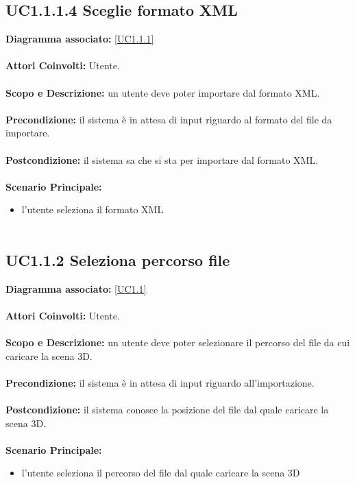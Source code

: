 \subsection{UC1.1.1.4 Sceglie formato XML}
\textbf{Diagramma associato:}
\ref{UC1.1.1} \\ \\
\textbf{Attori Coinvolti:}
Utente. \\ \\
\textbf{Scopo e Descrizione:}
un utente deve poter importare dal formato XML. \\ \\
\textbf{Precondizione:}
il sistema è in attesa di input riguardo al formato del file da importare. \\ \\
\textbf{Postcondizione:}
il sistema sa che si sta per importare dal formato XML. \\ \\
\textbf{Scenario Principale:}
\begin{itemize}
\item l'utente seleziona il formato XML
\\ \\ \end{itemize}


\subsection{UC1.1.2 Seleziona percorso file}
\textbf{Diagramma associato:}
\ref{UC1.1} \\ \\
\textbf{Attori Coinvolti:}
Utente. \\ \\
\textbf{Scopo e Descrizione:}
un utente deve poter selezionare il percorso del file da cui caricare la scena 3D. \\ \\
\textbf{Precondizione:}
il sistema è in attesa di input riguardo all'importazione. \\ \\
\textbf{Postcondizione:}
il sistema conosce la posizione del file dal quale caricare la scena 3D. \\ \\
\textbf{Scenario Principale:}
\begin{itemize}
\item l’utente seleziona il percorso del file dal quale caricare la scena 3D
\\ \\ \end{itemize}


